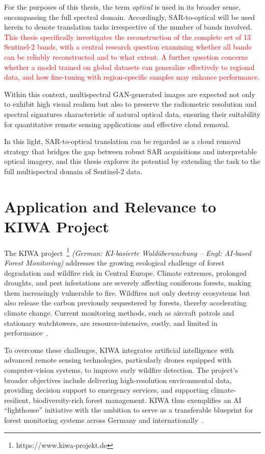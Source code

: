 For the purposes of this thesis, the term \emph{optical} is used in its broader sense, encompassing the full spectral domain. Accordingly, SAR-to-optical will be used herein to denote translation tasks irrespective of the number of bands involved. \textcolor{red}{This thesis specifically investigates the reconstruction of the complete set of 13 Sentinel-2 bands, with a central research question examining whether all bands can be reliably reconstructed and to what extent. A further question concerns whether a model trained on global datasets can generalize effectively to regional data, and how fine-tuning with region-specific samples may enhance performance}. 

Within this context, multispectral GAN-generated images are expected not only to exhibit high visual realism but also to preserve the radiometric resolution and spectral signatures characteristic of natural optical data, ensuring their suitability for quantitative remote sensing applications and effective cloud removal.

In this light, SAR-to-optical translation can be regarded as a cloud removal strategy that bridges the gap between robust SAR acquisitions and interpretable optical imagery, and this thesis explores its potential by extending the task to the full multispectral domain of Sentinel-2 data.

\section{Application and Relevance to KIWA Project}
The KIWA project~\footnote{https://www.kiwa-projekt.de} \textit{(German: KI-basierte Waldüberwachung – Engl: AI-based Forest Monitoring)} addresses the growing ecological challenge of forest degradation and wildfire risk in Central Europe. Climate extremes, prolonged droughts, and pest infestations are severely affecting coniferous forests, making them increasingly vulnerable to fire. Wildfires not only destroy ecosystems but also release the carbon previously sequestered by forests, thereby accelerating climate change. Current monitoring methods, such as aircraft patrols and stationary watchtowers, are resource-intensive, costly, and limited in performance~\cite{THD_ZAF}.

To overcome these challenges, KIWA integrates artificial intelligence with advanced remote sensing technologies, particularly drones equipped with computer-vision systems, to improve early wildfire detection. The project’s broader objectives include delivering high-resolution environmental data, providing decision support to emergency services, and supporting climate-resilient, biodiversity-rich forest management. KIWA thus exemplifies an AI “lighthouse” initiative with the ambition to serve as a transferable blueprint for forest monitoring systems across Germany and internationally~\cite{KIWA_Project}.

